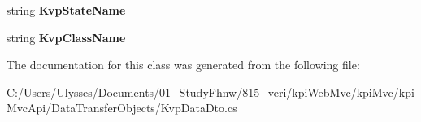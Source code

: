 \begin{DoxyCompactItemize}
\item 
\mbox{\label{classkpi_mvc_api_1_1_data_transfer_objects_1_1_kvp_data_dto_a51355ea3d90f7f8df5296dabf8a53fef}} 
string {\bfseries Kvp\+State\+Name}
\item 
\mbox{\label{classkpi_mvc_api_1_1_data_transfer_objects_1_1_kvp_data_dto_af58459f2fe09d39cb1caf862456a944f}} 
string {\bfseries Kvp\+Class\+Name}
\end{DoxyCompactItemize}


The documentation for this class was generated from the following file\+:\begin{DoxyCompactItemize}
\item 
C\+:/\+Users/\+Ulysses/\+Documents/01\+\_\+\+Study\+Fhnw/815\+\_\+veri/kpi\+Web\+Mvc/kpi\+Mvc/kpi\+Mvc\+Api/\+Data\+Transfer\+Objects/Kvp\+Data\+Dto.\+cs\end{DoxyCompactItemize}
